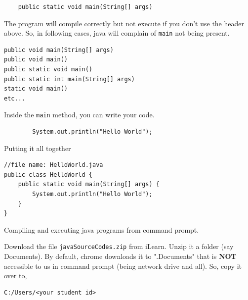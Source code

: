 \begin{questions}
\begin{verbatim}
	public static void main(String[] args)
\end{verbatim}

The program will compile correctly but not execute if you don't use the header above. So, in following cases, java will complain of \texttt{main} not being present.

\begin{verbatim}
public void main(String[] args)
public void main()
public static void main()
public static int main(String[] args)
static void main()
etc...
\end{verbatim}

Inside the \texttt{main} method, you can write your code.

\begin{verbatim}	
		System.out.println("Hello World");	
\end{verbatim}

Putting it all together

\begin{lstlisting}
//file name: HelloWorld.java
public class HelloWorld {
	public static void main(String[] args) {
		System.out.println("Hello World");
	}
}
\end{lstlisting}

\newpage

\begin{center}

\end{center}

\question Compiling and executing java programs from command prompt.

Download the file \texttt{javaSourceCodes.zip} from iLearn. Unzip it a folder (say Documents). By default, chrome downloads it to ".Documents" that is \textbf{NOT} accessible to us in command prompt (being network drive and all). So, copy it over to,
\begin{verbatim}
C:/Users/<your student id>
\end{verbatim}



\end{questions}

